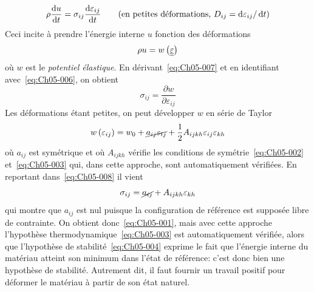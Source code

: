 \begin{equation}
    \rho \frac{\mathop{\mathrm{{}d}}\mathopen{} u}{\mathop{\mathrm{{}d}}\mathopen{} t} = \sigma_{ij} \frac{\mathop{\mathrm{{}d}}\mathopen{} \varepsilon_{ij}}{\mathop{\mathrm{{}d}}\mathopen{} t}\qquad\text{(en petites déformations, $D_{ij} = \mathop{\mathrm{{}d}}\mathopen{} \varepsilon_{ij} / \mathop{\mathrm{{}d}}\mathopen{} t$)}
    \label{eq:Ch05-006}
\end{equation}
Ceci incite à prendre l'énergie interne $u$ fonction des déformations
\begin{equation}
    \rho u = w \left( \underline{\underline{\varepsilon}} \right)
    \label{eq:Ch05-007}
\end{equation}
où $w$ est le \emph{potentiel élastique}.
En dérivant~\eqref{eq:Ch05-007} et en identifiant avec~\eqref{eq:Ch05-006}, on obtient
\begin{equation}
    \sigma_{ij} = \frac{\partial w}{\partial \varepsilon_{ij}}
    \label{eq:Ch05-008}
\end{equation}
Les déformations étant petites, on peut développer $w$ en série de Taylor
\begin{equation}
    w \left( \varepsilon_{ij} \right) = w_0 + \cancel{a_{ij} \varepsilon_{ij}} + \frac{1}{2} A_{ijkh} \varepsilon_{ij}\varepsilon_{kh}
    \label{eq:Ch05-009}
\end{equation}
où $a_{ij}$ est symétrique et où $A_{ijkh}$ vérifie les conditions de symétrie~\eqref{eq:Ch05-002} et~\eqref{eq:Ch05-003} qui, dans cette approche, sont automatiquement vérifiées.
En reportant dans~\eqref{eq:Ch05-008} il vient
\begin{displaymath}
    \sigma_{ij} = \cancel{a_{ij}} + A_{ijkh} \varepsilon_{kh}
\end{displaymath}
qui montre que $a_{ij}$ est nul puisque la configuration de référence est supposée libre de contrainte.
On obtient donc~\eqref{eq:Ch05-001}, mais avec cette approche l'hypothèse thermodynamique~\eqref{eq:Ch05-003} est automatiquement vérifiée, alors que l'hypothèse de stabilité~\eqref{eq:Ch05-004} exprime le fait que l'énergie interne du matériau atteint son minimum dans l'état de référence: c'est donc bien une hypothèse de stabilité.
Autrement dit, il faut fournir un travail positif pour déformer le matériau à partir de son état naturel.

